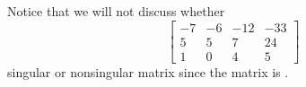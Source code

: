 \documentclass{ximera}
\begin{document}
\begin{example}
  Notice that we will not discuss whether
  \[
    \begin{bmatrix}
      -7&-6&- 12&-33\\
      5&5&7&24\\
      1&0&4&5
    \end{bmatrix}
  \]
  singular or nonsingular matrix since the matrix is
  .
\end{example}
\end{document}
